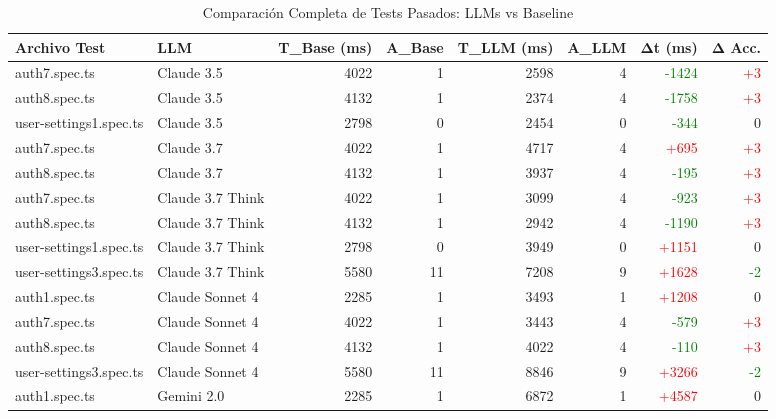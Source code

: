 
\begin{table}[htbp]
\centering
\caption{Comparación Completa de Tests Pasados: LLMs vs Baseline}
\label{tab:test_comparison_complete}
\tiny %
\begin{tabular}{|p{3cm}|p{2cm}|r|r|r|r|r|r|}
\hline
\textbf{Archivo Test} & \textbf{LLM} & \textbf{T\_Base (ms)} & \textbf{A\_Base} & \textbf{T\_LLM (ms)} & \textbf{A\_LLM} & \textbf{Δt (ms)} & \textbf{Δ Acc.} \\
\hline
auth7.spec.ts & Claude 3.5 & 4022 & 1 & 2598 & 4 & \textcolor{green}{-1424} & \textcolor{red}{+3} \\
auth8.spec.ts & Claude 3.5 & 4132 & 1 & 2374 & 4 & \textcolor{green}{-1758} & \textcolor{red}{+3} \\
user-settings1.spec.ts & Claude 3.5 & 2798 & 0 & 2454 & 0 & \textcolor{green}{-344} & 0 \\
\hline
auth7.spec.ts & Claude 3.7 & 4022 & 1 & 4717 & 4 & \textcolor{red}{+695} & \textcolor{red}{+3} \\
auth8.spec.ts & Claude 3.7 & 4132 & 1 & 3937 & 4 & \textcolor{green}{-195} & \textcolor{red}{+3} \\
\hline
auth7.spec.ts & Claude 3.7 Think & 4022 & 1 & 3099 & 4 & \textcolor{green}{-923} & \textcolor{red}{+3} \\
auth8.spec.ts & Claude 3.7 Think & 4132 & 1 & 2942 & 4 & \textcolor{green}{-1190} & \textcolor{red}{+3} \\
user-settings1.spec.ts & Claude 3.7 Think & 2798 & 0 & 3949 & 0 & \textcolor{red}{+1151} & 0 \\
user-settings3.spec.ts & Claude 3.7 Think & 5580 & 11 & 7208 & 9 & \textcolor{red}{+1628} & \textcolor{green}{-2} \\
\hline
auth1.spec.ts & Claude Sonnet 4 & 2285 & 1 & 3493 & 1 & \textcolor{red}{+1208} & 0 \\
auth7.spec.ts & Claude Sonnet 4 & 4022 & 1 & 3443 & 4 & \textcolor{green}{-579} & \textcolor{red}{+3} \\
auth8.spec.ts & Claude Sonnet 4 & 4132 & 1 & 4022 & 4 & \textcolor{green}{-110} & \textcolor{red}{+3} \\
user-settings3.spec.ts & Claude Sonnet 4 & 5580 & 11 & 8846 & 9 & \textcolor{red}{+3266} & \textcolor{green}{-2} \\
\hline
auth1.spec.ts & Gemini 2.0 & 2285 & 1 & 6872 & 1 & \textcolor{red}{+4587} & 0 \\

\end{tabular}
\end{table}
